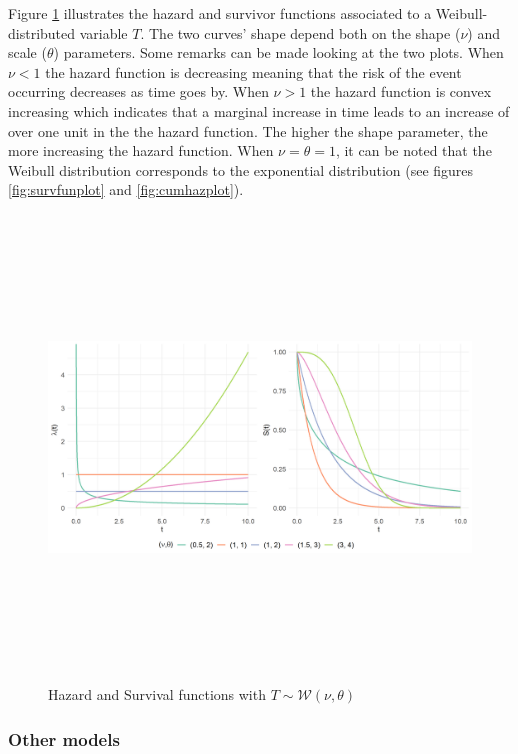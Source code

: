 \documentclass[
]{book}
\begin{document}
Figure \ref{fig:weibullplots} illustrates the hazard and survivor functions associated to a Weibull-distributed variable \(T\). The two curves' shape depend both on the shape (\(\nu\)) and scale (\(\theta\)) parameters. Some remarks can be made looking at the two plots. When \(\nu < 1\) the hazard function is decreasing meaning that the risk of the event occurring decreases as time goes by. When \(\nu > 1\) the hazard function is convex increasing which indicates that a marginal increase in time leads to an increase of over one unit in the the hazard function. The higher the shape parameter, the more increasing the hazard function. When \(\nu = \theta = 1\), it can be noted that the Weibull distribution corresponds to the exponential distribution (see figures \ref{fig:survfunplot} and \ref{fig:cumhazplot}).

\begin{figure}

{\centering \includegraphics[width=700pt,height=350pt]{./imgs/weibull_plots} 

}

\caption{Hazard and Survival functions with $T \sim \mathcal{W} (\nu, \theta)$}\label{fig:weibullplots}
\end{figure}

\hypertarget{other-models}{%
\subsubsection*{Other models}\label{other-models}}
\end{document}
